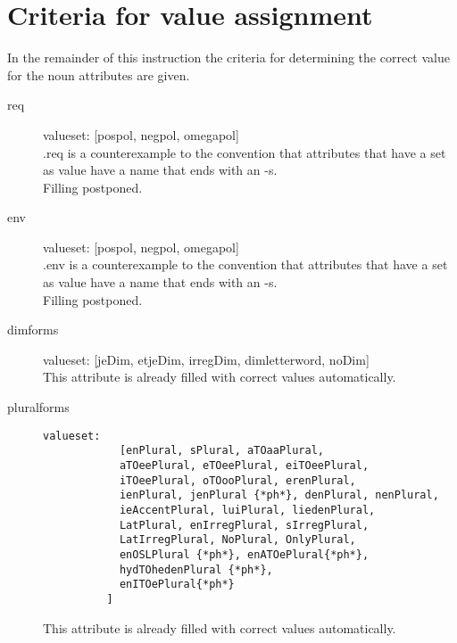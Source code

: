 \section{Criteria for value assignment}
In the remainder of this instruction the criteria for 
determining the correct value for the noun attributes are given.

\newpage

\begin{description}
\item
[req]\mbox{}

valueset: [pospol, negpol, omegapol]\\

.req is a counterexample to the convention that attributes that have a set
as value have a name that ends with an -s. \\

Filling postponed.

\newpage
\item 
[env]\mbox{}

valueset: [pospol, negpol, omegapol]\\

.env is a counterexample to the convention that attributes that have a set
as value have a name that ends with an -s. \\

Filling postponed.

\newpage
\item 
[dimforms]\mbox{}

valueset: [jeDim, etjeDim, irregDim, dimletterword, noDim]\\

This attribute is already filled with correct values automatically.
\newpage
\item 
[pluralforms]\mbox{}

\begin{verbatim}
valueset:  
            [enPlural, sPlural, aTOaaPlural, 
            aTOeePlural, eTOeePlural, eiTOeePlural,
            iTOeePlural, oTOooPlural, erenPlural, 
            ienPlural, jenPlural {*ph*}, denPlural, nenPlural,
            ieAccentPlural, luiPlural, liedenPlural, 
            LatPlural, enIrregPlural, sIrregPlural,
            LatIrregPlural, NoPlural, OnlyPlural,
            enOSLPlural {*ph*}, enATOePlural{*ph*}, 
            hydTOhedenPlural {*ph*},
            enITOePlural{*ph*} 
          ]
\end{verbatim}

This attribute is already filled with correct values automatically.


\end{description}
